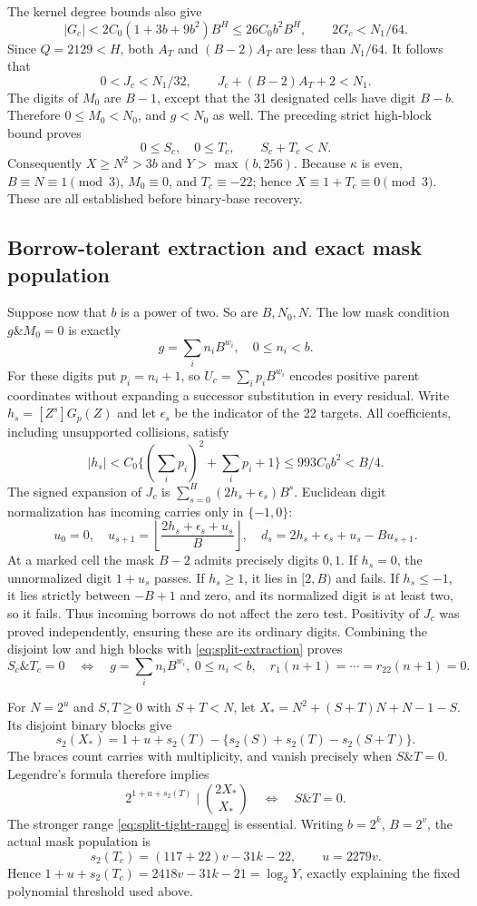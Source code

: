 The kernel degree bounds also give
\[
 |G_c|<2C_0(1+3b+9b^2)B^H\le26C_0b^2B^H,\qquad
 2G_c<N_1/64.
\]
Since $Q=2129<H$, both $A_T$ and $(B-2)A_T$ are less than $N_1/64$.
It follows that
\[
 0<J_c<N_1/32,\qquad J_c+(B-2)A_T+2<N_1.
\]
The digits of $M_0$ are $B-1$, except that the 31 designated cells
have digit $B-b$. Therefore $0\le M_0<N_0$, and $g<N_0$ as well.
The preceding strict high-block bound proves
\begin{equation}\label{eq:split-tight-range}
 0\le S_c,\quad0\le T_c,\qquad S_c+T_c<N.
\end{equation}
Consequently $X\ge N^2>3b$ and $Y>\max(b,256)$. Because $\kappa$ is
even, $B\equiv N\equiv1\pmod3$, $M_0\equiv0$, and
$T_c\equiv-22$; hence $X\equiv1+T_c\equiv0\pmod3$.
These are all established before binary-base recovery.

\subsection{Borrow-tolerant extraction and exact mask population}

Suppose now that $b$ is a power of two. So are $B,N_0,N$. The low
mask condition $g\mathbin{\&}M_0=0$ is exactly
\[
 g=\sum_i n_iB^{w_i},\quad0\le n_i<b.
\]
For these digits put $p_i=n_i+1$, so $U_c=\sum_i p_iB^{w_i}$ encodes
positive parent coordinates without expanding a successor substitution
in every residual. Write $h_s=[Z^s]G_p(Z)$ and let $\epsilon_s$ be the
indicator of the 22 targets. All coefficients, including unsupported
collisions, satisfy
\[
 |h_s|<C_0\{(\sum_i p_i)^2+\sum_i p_i+1\}
 \le993C_0b^2<B/4.
\]
The signed expansion of $J_c$ is $\sum_{s=0}^{H}(2h_s+\epsilon_s)B^s$.
Euclidean digit normalization has incoming carries only in $\{-1,0\}$:
\[
 u_0=0,\quad u_{s+1}=\left\lfloor\frac{2h_s+\epsilon_s+u_s}{B}\right\rfloor,
 \quad d_s=2h_s+\epsilon_s+u_s-Bu_{s+1}.
\]
At a marked cell the mask $B-2$ admits precisely digits $0,1$.
If $h_s=0$, the unnormalized digit $1+u_s$ passes. If $h_s\ge1$,
it lies in $[2,B)$ and fails. If $h_s\le-1$, it lies strictly between
$-B+1$ and zero, and its normalized digit is at least two, so it fails.
Thus incoming borrows do not affect the zero test. Positivity of $J_c$
was proved independently, ensuring these are its ordinary digits.
Combining the disjoint low and high blocks with
\eqref{eq:split-extraction} proves
\[
 S_c\mathbin{\&}T_c=0
 \quad\Longleftrightarrow\quad
 g=\sum_i n_iB^{w_i},\ 0\le n_i<b,\quad r_1(n+1)=\cdots=r_{22}(n+1)=0.
\]

For $N=2^u$ and $S,T\ge0$ with $S+T<N$, let
$X_*=N^2+(S+T)N+N-1-S$. Its disjoint binary blocks give
\[
 s_2(X_*)=1+u+s_2(T)-\{s_2(S)+s_2(T)-s_2(S+T)\}.
\]
The braces count carries with multiplicity, and vanish precisely when
$S\mathbin{\&}T=0$. Legendre's formula therefore implies
\[
 2^{1+u+s_2(T)}\mid\binom{2X_*}{X_*}
 \quad\Longleftrightarrow\quad S\mathbin{\&}T=0.
\]
The stronger range \eqref{eq:split-tight-range} is essential.
Writing $b=2^k$, $B=2^v$, the actual mask population is
\[
 s_2(T_c)=(117+22)v-31k-22,\qquad u=2279v.
\]
Hence $1+u+s_2(T_c)=2418v-31k-21=\log_2Y$, exactly explaining the
fixed polynomial threshold used above.

